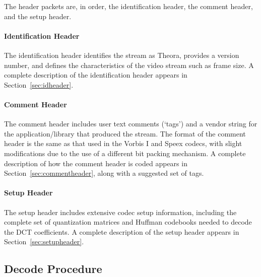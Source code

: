 \documentclass[9pt,letterpaper]{book}
\numberwithin{equation}{chapter}
\numberwithin{figure}{chapter}
\numberwithin{table}{chapter}
\begin{document}
The header packets are, in order, the identification header, the comment
 header, and the setup header.

\paragraph{Identification Header}

The identification header identifies the stream as Theora, provides a version
 number, and defines the characteristics of the video stream such as frame
 size.
A complete description of the identification header appears in
 Section~\ref{sec:idheader}.

\paragraph{Comment Header}

The comment header includes user text comments (`tags') and a vendor string
 for the application/library that produced the stream.
The format of the comment header is the same as that used in the Vorbis I and
 Speex codecs, with slight modifications due to the use of a different bit
 packing mechanism.
A complete description of how the comment header is coded appears in
 Section~\ref{sec:commentheader}, along with a suggested set of tags.

\paragraph{Setup Header}

The setup header includes extensive codec setup information, including the
 complete set of quantization matrices and Huffman codebooks needed to decode
 the DCT coefficients.
A complete description of the setup header appears in
 Section~\ref{sec:setupheader}.

\subsection{Decode Procedure}
\end{document}
